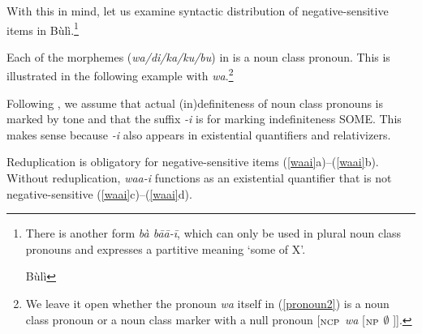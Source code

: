 \documentclass[output=paper,colorlinks,citecolor=brown]{langscibook}
\begin{document}
With this in mind, let us examine syntactic distribution of negative-sensitive items in Bùlì.\footnote{There is another form \textit{bà bāā-ī}, which can only be used in plural noun class pronouns and expresses a partitive meaning `some of X'.


\ea Bùlì
\z
\z
}


Each of the morphemes (\textit{wa/di/ka/ku/bu}) in  is a noun class pronoun. This is illustrated in the following example with \textit{wa}.\footnote{We leave it open whether the pronoun \textit{wa} itself in (\ref{pronoun2}) is a noun class pronoun or a noun class marker with a null pronoun [$_{\textup{NCP}}$ \textit{wa} [$_{\textup{NP}}$ $\emptyset$ ]].}

{}
\z

Following \cite{HiraiwaEtAl2017}, we assume that actual (in)definiteness of noun class pronouns is marked by tone and that the suffix \textit{-i} is for marking indefiniteness SOME. This makes sense because \textit{-i} also appears in existential quantifiers and relativizers.

\z

\z

Reduplication is obligatory for negative-sensitive items (\ref{waai}a)--(\ref{waai}b). Without reduplication, \textit{waa-i} functions as an existential quantifier that is not negative-sensitive (\ref{waai}c)--(\ref{waai}d).
\end{document}
